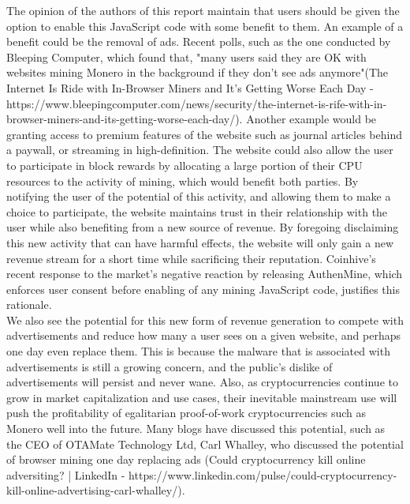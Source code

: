 The opinion of the authors of this report maintain that users should be given the option to enable this JavaScript code with some benefit to them.  An example of a benefit could be the removal of ads. Recent polls, such as the one conducted by Bleeping Computer, which found that, "many users said they are OK with websites mining Monero in the background if they don't see ads anymore"(The Internet Is Ride with In-Browser Miners and It's Getting Worse Each Day - https://www.bleepingcomputer.com/news/security/the-internet-is-rife-with-in-browser-miners-and-its-getting-worse-each-day/). Another example would be granting access to premium features of the website such as journal articles behind a paywall, or streaming in high-definition. The website could also allow the user to participate in block rewards by allocating a large portion of their CPU resources to the activity of mining, which would benefit both parties. By notifying the user of the potential of this activity, and allowing them to make a choice to participate, the website maintains trust in their relationship with the user while also benefiting from a new source of revenue. By foregoing disclaiming this new activity that can have harmful effects, the website will only gain a new revenue stream for a short time while sacrificing their reputation. Coinhive’s recent response to the market’s negative reaction by releasing AuthenMine, which enforces user consent before enabling of any mining JavaScript code, justifies this rationale. 
\\
We also see the potential for this new form of revenue generation to compete with advertisements and reduce how many a user sees on a given website, and perhaps one day even replace them. This is because the malware that is associated with advertisements is still a growing concern, and the public’s dislike of advertisements will persist and never wane. Also, as cryptocurrencies continue to grow in market capitalization and use cases, their inevitable mainstream use will push the profitability of egalitarian proof-of-work cryptocurrencies such as Monero well into the future. Many blogs have discussed this potential, such as the CEO of OTAMate Technology Ltd, Carl Whalley, who discussed the potential of browser mining one day replacing ads (Could cryptocurrency kill online adversiting? | LinkedIn - https://www.linkedin.com/pulse/could-cryptocurrency-kill-online-advertising-carl-whalley/).

